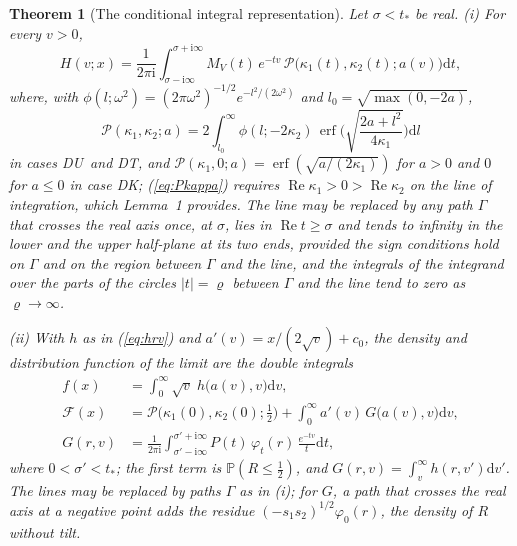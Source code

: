 \documentclass[ecta,nameyear,final,supplement]{econsocart}
\newcommand{\PP}{{\mathbb P}}
\newcommand{\dr}[1]{{\mathrm d}#1}
\newcommand{\iu}{{\mathrm i}}
\newcommand{\Rea}{\operatorname{Re}}
\newcommand{\erf}{\operatorname{erf}}
\newcommand{\Fk}{\textsf{\upshape DK}}
\newcommand{\Fu}{\textsf{\upshape DU}}
\newcommand{\Ft}{\textsf{\upshape DT}}
\newcommand{\cF}{\mathcal{F}}
\newcommand{\cP}{\mathcal{P}}
\theoremstyle{plain}
\newtheorem{theorem}{Theorem}
\theoremstyle{definition}
\begin{document}
\begin{theorem}[The conditional integral representation]
\label{th:double}
Let $\sigma<t_*$ be real.  (i) For every $v>0$,
\begin{equation}
H(v;x)=\frac1{2\pi\iu}\int_{\sigma-\iu\infty}^{\sigma+\iu\infty}M_V(t)\,e^{-tv}\,\cP\big(\kappa_1(t),\kappa_2(t);a(v)\big)\dr{t},
\label{eq:Hlim}
\end{equation}
where, with $\phi(l;\omega^2)=(2\pi\omega^2)^{-1/2}e^{-l^2/(2\omega^2)}$ and $l_0=\sqrt{\max(0,-2a)}$,
\begin{equation}
\cP(\kappa_1,\kappa_2;a)=2\int_{l_0}^\infty\phi(l;-2\kappa_2)\,\erf\Big(\sqrt{\frac{2a+l^2}{4\kappa_1}}\Big)\dr{l}
\label{eq:Pkappa}
\end{equation}
in cases \Fu\ and \Ft, and $\cP(\kappa_1,0;a)=\erf(\sqrt{a/(2\kappa_1)})$ for $a>0$ and $0$ for $a\le0$ in case \Fk; (\ref{eq:Pkappa}) requires $\Rea\kappa_1>0>\Rea\kappa_2$ on the line of integration, which Lemma~1 provides.  The line may be replaced by any path $\Gamma$ that crosses the real axis once, at $\sigma$, lies in $\Rea t\ge\sigma$ and tends to infinity in the lower and the upper half-plane at its two ends, provided the sign conditions hold on $\Gamma$ and on the region between $\Gamma$ and the line, and the integrals of the integrand over the parts of the circles $|t|=\varrho$ between $\Gamma$ and the line tend to zero as $\varrho\to\infty$.

(ii) With $h$ as in (\ref{eq:hrv}) and $a'(v)=x/(2\sqrt v)+c_0$, the density and distribution function of the limit are the double integrals
\begin{align}
f(x)&=\int_0^\infty\sqrt v\;h\big(a(v),v\big)\dr{v},
\label{eq:flim}\\
\cF(x)&=\cP\big(\kappa_1(0),\kappa_2(0);\tfrac12\big)+\int_0^\infty a'(v)\,G\big(a(v),v\big)\dr{v},
\label{eq:Flim}\\
G(r,v)&=\frac1{2\pi\iu}\int_{\sigma'-\iu\infty}^{\sigma'+\iu\infty}P(t)\,\varphi_t(r)\,\frac{e^{-tv}}t\dr{t},
\label{eq:Glim}
\end{align}
where $0<\sigma'<t_*$; the first term is $\PP(R\le\frac12)$, and $G(r,v)=\int_v^\infty h(r,v')\dr{v'}$.  The lines may be replaced by paths $\Gamma$ as in (i); for $G$, a path that crosses the real axis at a negative point adds the residue $(-s_1s_2)^{1/2}\varphi_0(r)$, the density of $R$ without tilt.
\end{theorem}
\end{document}
